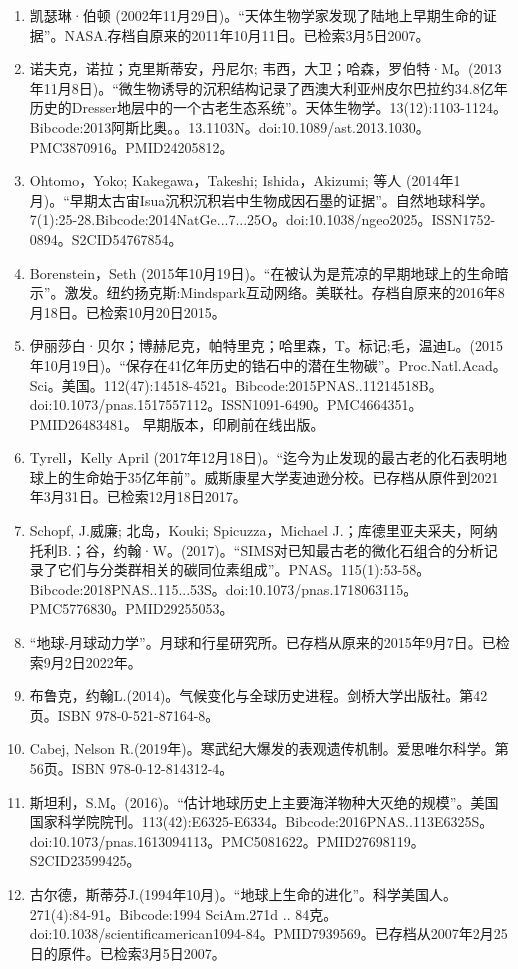 \begin{enumerate}
\item 凯瑟琳·伯顿 (2002年11月29日)。“天体生物学家发现了陆地上早期生命的证据”。NASA.存档自原来的2011年10月11日。已检索3月5日2007。
\item 诺夫克，诺拉；克里斯蒂安，丹尼尔; 韦西，大卫；哈森，罗伯特·M。(2013年11月8日)。“微生物诱导的沉积结构记录了西澳大利亚州皮尔巴拉约34.8亿年历史的Dresser地层中的一个古老生态系统”。天体生物学。13(12):1103-1124。Bibcode:2013阿斯比奥。。13.1103N。doi:10.1089/ast.2013.1030。PMC3870916。PMID24205812。  
\item Ohtomo，Yoko; Kakegawa，Takeshi; Ishida，Akizumi; 等人 (2014年1月)。“早期太古宙Isua沉积沉积岩中生物成因石墨的证据”。自然地球科学。7(1):25-28.Bibcode:2014NatGe...7...25O。doi:10.1038/ngeo2025。ISSN1752-0894。S2CID54767854。  
\item Borenstein，Seth (2015年10月19日)。“在被认为是荒凉的早期地球上的生命暗示”。激发。纽约扬克斯:Mindspark互动网络。美联社。存档自原来的2016年8月18日。已检索10月20日2015。
\item 伊丽莎白·贝尔；博赫尼克，帕特里克；哈里森，T。标记;毛，温迪L。(2015年10月19日)。“保存在41亿年历史的锆石中的潜在生物碳”。Proc.Natl.Acad。Sci。美国。112(47):14518-4521。Bibcode:2015PNAS..11214518B。doi:10.1073/pnas.1517557112。ISSN1091-6490。PMC4664351。PMID26483481。   早期版本，印刷前在线出版。
\item Tyrell，Kelly April (2017年12月18日)。“迄今为止发现的最古老的化石表明地球上的生命始于35亿年前”。威斯康星大学麦迪逊分校。已存档从原件到2021年3月31日。已检索12月18日2017。
\item Schopf, J.威廉; 北岛，Kouki; Spicuzza，Michael J.；库德里亚夫采夫，阿纳托利B.；谷，约翰·W。(2017)。“SIMS对已知最古老的微化石组合的分析记录了它们与分类群相关的碳同位素组成”。PNAS。115(1):53-58。Bibcode:2018PNAS..115...53S。doi:10.1073/pnas.1718063115。PMC5776830。PMID29255053。  
\item “地球-月球动力学”。月球和行星研究所。已存档从原来的2015年9月7日。已检索9月2日2022年。
\item 布鲁克，约翰L.(2014)。气候变化与全球历史进程。剑桥大学出版社。第42页。ISBN 978-0-521-87164-8。
\item Cabej, Nelson R.(2019年)。寒武纪大爆发的表观遗传机制。爱思唯尔科学。第56页。ISBN 978-0-12-814312-4。
\item 斯坦利，S.M。(2016)。“估计地球历史上主要海洋物种大灭绝的规模”。美国国家科学院院刊。113(42):E6325-E6334。Bibcode:2016PNAS..113E6325S。doi:10.1073/pnas.1613094113。PMC5081622。PMID27698119。S2CID23599425。    
\item 古尔德，斯蒂芬J.(1994年10月)。“地球上生命的进化”。科学美国人。271(4):84-91。Bibcode:1994 SciAm.271d .. 84克。doi:10.1038/scientificamerican1094-84。PMID7939569。已存档从2007年2月25日的原件。已检索3月5日2007。 

\end{enumerate}
